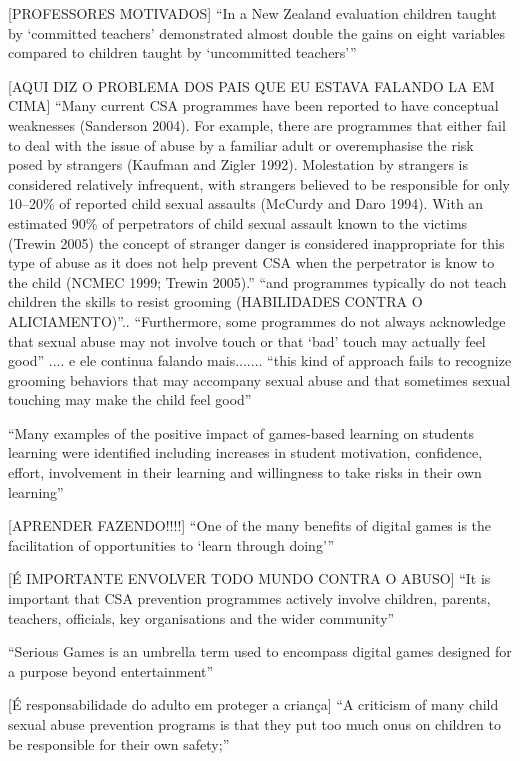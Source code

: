 [PROFESSORES MOTIVADOS]
``In a New Zealand evaluation children taught by ‘committed teachers’ demonstrated almost double the gains on eight variables compared to children taught by ‘uncommitted teachers’'' \cite{dip2016advancing}

[AQUI DIZ O PROBLEMA DOS PAIS QUE EU ESTAVA FALANDO LA EM CIMA]
``Many current CSA programmes have been reported to have conceptual weaknesses (Sanderson 2004). For example, there are programmes that either fail to deal with the issue of abuse by a familiar adult or overemphasise the risk posed by strangers (Kaufman and Zigler 1992). Molestation by strangers is considered relatively infrequent, with strangers believed to be responsible for only 10–20\% of reported child sexual assaults (McCurdy and Daro 1994). With an estimated 90\% of perpetrators of child sexual assault known to the victims (Trewin 2005) the concept of stranger danger is considered inappropriate for this type of abuse as it does not help prevent CSA when the perpetrator is know to the child (NCMEC 1999; Trewin 2005).''\cite{dip2016advancing} ``and programmes typically do not teach children the skills to resist grooming (HABILIDADES CONTRA O ALICIAMENTO)''.. ``Furthermore, some programmes do not always acknowledge that sexual abuse may not involve touch or that ‘bad’ touch may actually feel good'' .... e ele continua falando mais....... ``this kind of approach fails to recognize grooming behaviors that may accompany sexual abuse and that sometimes sexual touching may make the child feel good''


``Many examples of the positive impact of games-based learning on students learning were identified including increases in student motivation, confidence, effort, involvement in their learning and willingness to take risks in their own learning''\cite{dip2016advancing}

[APRENDER FAZENDO!!!!]
``One of the many benefits of digital games is the facilitation of opportunities to ‘learn through doing’'' \cite{dip2016advancing}

[É IMPORTANTE ENVOLVER TODO MUNDO CONTRA O ABUSO]
``It is important that CSA prevention programmes actively involve children, parents, teachers, officials, key organisations and the wider community''  \cite{dip2016advancing}

``Serious Games is an umbrella term used to encompass digital games designed for a purpose beyond entertainment''\cite{dip2016advancing}

[É responsabilidade do adulto em proteger a criança]
``A criticism of many child sexual abuse prevention programs is that they put too much onus on children to be responsible for their own safety;'' \cite{dip2016advancing}


